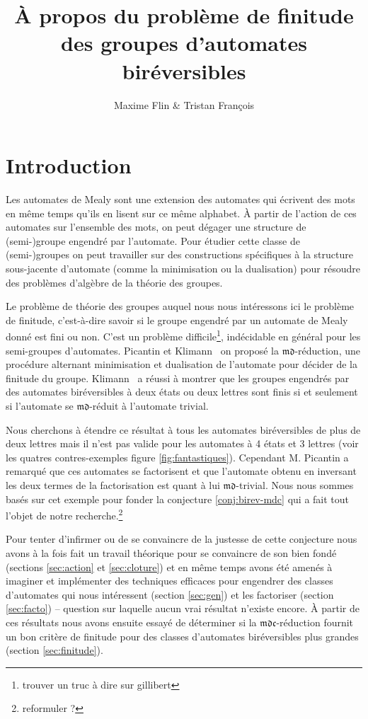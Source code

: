 \documentclass[11pt,a4paper]{article}
\title{À propos du problème de finitude des groupes d'automates biréversibles}
\author{Maxime Flin \& Tristan François}
\begin{document}
\maketitle

\section*{Introduction}
Les automates de Mealy sont une extension des automates qui écrivent des mots en même temps qu'ils en lisent sur ce même alphabet. À partir de l'action de ces automates sur l'ensemble des mots, on peut dégager une structure de (semi-)groupe engendré par l'automate. Pour étudier cette classe de (semi-)groupes on peut travailler sur des constructions spécifiques à la structure sous-jacente d'automate (comme la minimisation ou la dualisation) pour résoudre des problèmes d'algèbre de la théorie des groupes.

Le problème de théorie des groupes auquel nous nous intéressons ici le problème de finitude, c'est-à-dire savoir si le groupe engendré par un automate de Mealy donné est fini ou non. C'est un problème difficile\footnote{trouver un truc à dire sur gillibert}, indécidable en général pour les semi-groupes d'automates. Picantin et Klimann~\cite{DBLP:journals/corr/abs-1105-4725} on proposé la $\mathfrak{md}$-réduction, une procédure alternant minimisation et dualisation de l'automate pour décider de la finitude du groupe. Klimann~\cite{Klimann13} a réussi à montrer que les groupes engendrés par des automates biréversibles à deux états ou deux lettres sont finis si et seulement si l'automate se $\mathfrak{md}$-réduit à l'automate trivial.

Nous cherchons à étendre ce résultat à tous les automates biréversibles de plus de deux lettres mais il n'est pas valide pour les automates à 4 états et 3 lettres (voir les quatres contres-exemples figure \ref{fig:fantastiques}). Cependant M. Picantin a remarqué que ces automates se factorisent et que l'automate obtenu en inversant les deux termes de la factorisation est quant à lui $\mathfrak{md}$-trivial. Nous nous sommes basés sur cet exemple pour fonder la conjecture \ref{conj:birev-mdc} qui a fait tout l'objet de notre recherche.\footnote{reformuler ?}

Pour tenter d'infirmer ou de se convaincre de la justesse de cette conjecture nous avons à la fois fait un travail théorique pour se convaincre de son bien fondé (sections \ref{sec:action} et \ref{sec:cloture}) et en même temps avons été amenés à imaginer et implémenter des techniques efficaces pour engendrer des classes d'automates qui nous intéressent (section \ref{sec:gen}) et les factoriser (section \ref{sec:facto}) -- question sur laquelle aucun vrai résultat n'existe encore. À partir de ces résultats nous avons ensuite essayé de déterminer si la $\mathfrak{mdc}$-réduction fournit un bon critère de finitude pour des classes d'automates biréversibles plus grandes (section \ref{sec:finitude}).
\end{document}
